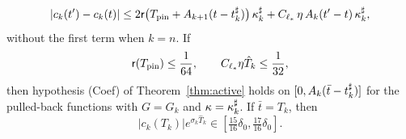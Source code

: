 \begin{lemma}
\begin{equation}
\label{eq:drift-interval}
|c_k(t')-c_k(t)|\le2\mathsf{r}\big(T_{\mathrm{pin}}+A_{k+1}(t-t^\sharp_k)\big)\,\kappa^\sharp_k
+C_{\ell_*}\,\eta\,A_k(t'-t)\,\kappa^\sharp_k,
\end{equation}
without the first term when $k=n$. If
\begin{equation}
\label{eq:drift-smallness}
\mathsf{r}(T_{\mathrm{pin}})\le\frac1{64},\qquad C_{\ell_*}\eta\hat T_k\le\frac1{32},
\end{equation}
then hypothesis \textup{(Coef)} of
Theorem~\ref{thm:active} holds on $[0,A_k(\bar t-t^\sharp_k)]$ for the pulled-back
functions with $G=G_k$ and $\kappa=\kappa^\sharp_k$. If $\bar t=T_k$, then
\begin{equation}
\label{eq:drift-saturation}
|c_k(T_k)|e^{\sigma_k\hat T_k}\in[\tfrac{15}{16}\delta_0,\tfrac{17}{16}\delta_0].
\end{equation}
\end{lemma}

